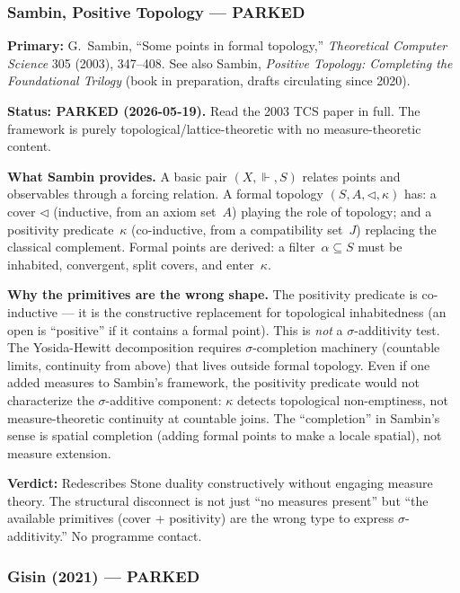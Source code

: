 \subsubsection*{Sambin, Positive Topology --- PARKED}

\noindent\textbf{Primary:} G.~Sambin, ``Some points in formal
topology,'' \emph{Theoretical Computer Science} 305 (2003), 347--408.
See also Sambin, \emph{Positive Topology: Completing the Foundational
Trilogy} (book in preparation, drafts circulating since 2020).

\medskip\noindent
\textbf{Status: PARKED (2026-05-19).}  Read the 2003 TCS
paper in full.  The framework is purely topological/lattice-theoretic
with no measure-theoretic content.

\textbf{What Sambin provides.}  A basic pair $(X, \Vdash, S)$
relates points and observables through a forcing relation.  A formal
topology $(S, A, \triangleleft, \kappa)$ has: a cover
$\triangleleft$ (inductive, from an axiom set~$A$) playing the role
of topology; and a positivity predicate~$\kappa$ (co-inductive, from
a compatibility set~$J$) replacing the classical complement.  Formal
points are derived: a filter~$\alpha \subseteq S$ must be inhabited,
convergent, split covers, and enter~$\kappa$.

\textbf{Why the primitives are the wrong shape.}  The positivity
predicate is co-inductive --- it is the constructive replacement for
topological inhabitedness (an open is ``positive'' if it contains a
formal point).  This is \emph{not} a $\sigma$-additivity test.  The
Yosida-Hewitt decomposition requires $\sigma$-completion machinery
(countable limits, continuity from above) that lives outside formal
topology.  Even if one added measures to Sambin's framework, the
positivity predicate would not characterize the $\sigma$-additive
component: $\kappa$ detects topological non-emptiness, not
measure-theoretic continuity at countable joins.  The ``completion''
in Sambin's sense is spatial completion (adding formal points to make
a locale spatial), not measure extension.

\textbf{Verdict:} Redescribes Stone duality constructively without
engaging measure theory.  The structural disconnect is not just ``no
measures present'' but ``the available primitives (cover +
positivity) are the wrong type to express $\sigma$-additivity.''  No
programme contact.

\subsubsection*{Gisin (2021) --- PARKED}

